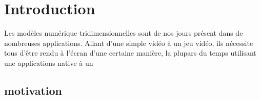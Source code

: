 \chapter*{Introduction}

Les modèles numérique tridimensionnelles sont de nos jours présent dans de
nombreuses applications. Allant d'une simple vidéo à un jeu vidéo, ils nécessite
tous d'être rendu à l'écran d'une certaine manière, la plupars du temps
utilisant une applications native à un

\section{motivation}



